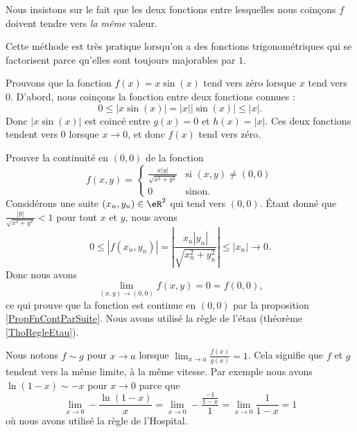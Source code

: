 Nous insistons sur le fait que les deux fonctions entre lesquelles nous coinçons $f$ doivent tendre vers \emph{la même} valeur.

Cette méthode est très pratique lorsqu'on a des fonctions trigonométriques qui se factorisent parce qu'elles sont toujours majorables par $1$.
\begin{example}
	Prouvons que la fonction $f(x)=x\sin(x)$ tend vers zéro lorsque $x$ tend vers $0$. D'abord, nous coinçons la fonction entre deux fonctions connues :
	\begin{equation}
		0\leq| x\sin(x) |=| x | |\sin(x) |\leq | x |.
	\end{equation}
	Donc $| x\sin(x) |$ est coincé entre $g(x)=0$ et $h(x)=| x |$. Ces deux fonctions tendent vers $0$ lorsque $x\to 0$, et donc $f(x)$ tend vers zéro.
\end{example}


\begin{example}
	Prouver la continuité en $(0,0)$ de la fonction
	\begin{equation}
		f(x,y)=\begin{cases}
			\frac{ x | y | }{ \sqrt{x^2+y^2} }	&	\text{si $(x,y)\neq (0,0)$}\\
			0	&	 \text{sinon.}
		\end{cases}
	\end{equation}
	Considérons une suite $(x_n,y_n)\in\eR^2$ qui tend vers $(0,0)$. Étant donné que $\frac{ | y | }{ \sqrt{x^2+y^2} }<1$ pour tout $x$ et $y$, nous avons
	\begin{equation}
		0\leq | f(x_n,y_n) |=\left| \frac{ x_n | y_n | }{ \sqrt{x_n^2+y_n^2} } \right| \leq | x_n |\to 0.
	\end{equation}
	Donc nous avons
	\begin{equation}
		\lim_{(x,y)\to(0,0)}f(x,y)=0=f(0,0),
	\end{equation}
	ce qui prouve que la fonction est continue en $(0,0)$ par la proposition \ref{PropFnContParSuite}. Nous avons utilisé la règle de l'étau (théorème \ref{ThoRegleEtau}).
\end{example}

Nous notons \( f\sim g\) pour \( x\to a\) lorsque \( \lim_{x\to a} \frac{ f(x) }{ g(x) }=1\). Cela signifie que \( f\) et \( g\) tendent vers la même limite, à la même vitesse. Par exemple nous avons \( \ln(1-x)\sim -x\) pour \( x\to 0\) parce que
\begin{equation}    \label{EqGICpOX}
    \lim_{x\to 0} -\frac{ \ln(1-x) }{ x }=\lim_{x\to 0} -\frac{ \frac{ -1 }{ 1-x } }{ 1 }=\lim_{x\to 0} \frac{1}{ 1-x }=1
\end{equation}
où nous avons utilisé la règle de l'Hospital.

